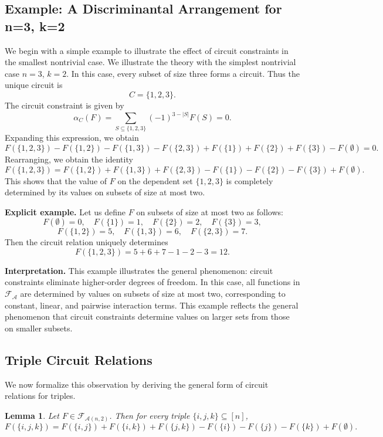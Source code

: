 \documentclass{amsart}
\newtheorem{lemma}[theorem]{Lemma}
\theoremstyle{definition}
\begin{document}
\subsection{Example: A Discriminantal Arrangement for n=3, k=2}
We begin with a simple example to illustrate the effect of circuit constraints in the smallest nontrivial case.
We illustrate the theory with the simplest nontrivial case $n=3$, $k=2$. In this case, every subset of size three forms a circuit. Thus the unique circuit is
\[
C = \{1,2,3\}.
\]
\noindent
The circuit constraint is given by
\[
\alpha_C(F) = \sum_{S \subseteq \{1,2,3\}} (-1)^{3-|S|} F(S) = 0.
\]
\noindent
Expanding this expression, we obtain
\[
F(\{1,2,3\}) 
- F(\{1,2\}) - F(\{1,3\}) - F(\{2,3\})
+ F(\{1\}) + F(\{2\}) + F(\{3\})
- F(\emptyset) = 0.
\]
\noindent
Rearranging, we obtain the identity
\[
F(\{1,2,3\}) =
F(\{1,2\}) + F(\{1,3\}) + F(\{2,3\})
- F(\{1\}) - F(\{2\}) - F(\{3\})
+ F(\emptyset).
\]
\noindent
This shows that the value of $F$ on the dependent set $\{1,2,3\}$ is completely determined by its values on subsets of size at most two.

\medskip

\noindent
\textbf{Explicit example.}
Let us define $F$ on subsets of size at most two as follows:
\[
F(\emptyset)=0,\quad
F(\{1\})=1,\quad F(\{2\})=2,\quad F(\{3\})=3,
\]
\[
F(\{1,2\})=5,\quad F(\{1,3\})=6,\quad F(\{2,3\})=7.
\]
\noindent
Then the circuit relation uniquely determines
\[
F(\{1,2,3\}) = 5 + 6 + 7 - 1 - 2 - 3 = 12.
\]

\medskip

\noindent
\textbf{Interpretation.}
This example illustrates the general phenomenon: circuit constraints eliminate higher-order degrees of freedom. In this case, all functions in $\mathcal{F}_{\mathcal{A}}$ are determined by values on subsets of size at most two, corresponding to constant, linear, and pairwise interaction terms.
This example reflects the general phenomenon that circuit constraints determine values on larger sets from those on smaller subsets.
\subsection{Triple Circuit Relations}
We now formalize this observation by deriving the general form of circuit relations for triples.
\begin{lemma}\label{lem:triple}
Let $F \in \mathcal{F}_{\mathcal{A}(n,2)}$. Then for every triple $\{i,j,k\} \subseteq [n]$,
\[
F(\{i,j,k\}) = F(\{i,j\}) + F(\{i,k\}) + F(\{j,k\}) - F(\{i\}) - F(\{j\}) - F(\{k\}) + F(\emptyset).
\]
\end{lemma}
\end{document}
